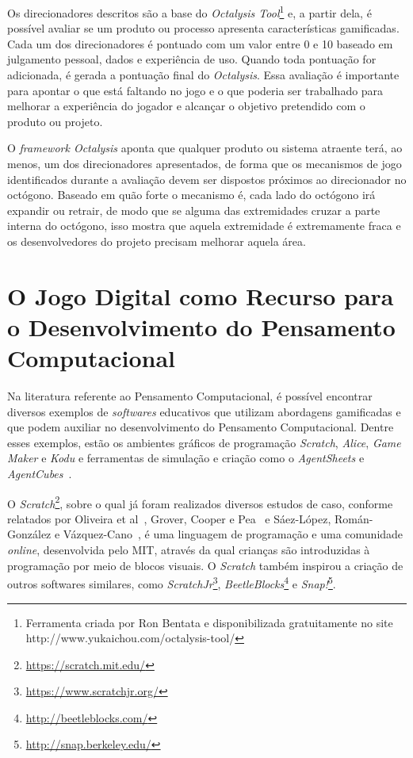 Os direcionadores descritos são a base do \textit{Octalysis Tool}\footnote{Ferramenta criada por Ron Bentata e disponibilizada gratuitamente no site http://www.yukaichou.com/octalysis-tool/} e, a partir dela, é possível avaliar se um produto ou processo apresenta características gamificadas. Cada um dos direcionadores é pontuado com um valor entre 0 e 10 baseado em julgamento pessoal, dados e experiência de uso. Quando toda pontuação for adicionada, é gerada a pontuação final do \textit{Octalysis}. Essa avaliação é importante para apontar o que está faltando no jogo e o que poderia ser trabalhado para melhorar a experiência do jogador e alcançar o objetivo pretendido com o produto ou projeto.

O \textit{framework Octalysis} aponta que qualquer produto ou sistema atraente terá, ao menos, um dos direcionadores apresentados, de forma que os mecanismos de jogo identificados durante a avaliação devem ser dispostos próximos ao direcionador no octógono. Baseado em quão forte o mecanismo é, cada lado do octógono irá expandir ou retrair, de modo que se alguma das extremidades cruzar a parte interna do octógono, isso mostra que aquela extremidade é extremamente fraca e os desenvolvedores do projeto precisam melhorar aquela área.


\section{O Jogo Digital como Recurso para o Desenvolvimento do Pensamento Computacional} \label{sec:jogos_desenvolvimento_pc}

Na literatura referente ao Pensamento Computacional, é possível encontrar diversos exemplos de \textit{softwares} educativos que utilizam abordagens gamificadas e que podem auxiliar no desenvolvimento do Pensamento Computacional. Dentre esses exemplos, estão os ambientes gráficos de programação \textit{Scratch}, \textit{Alice}, \textit{Game Maker} e \textit{Kodu} e ferramentas de simulação e criação como o \textit{AgentSheets} e \textit{AgentCubes}~\cite{grover_computational_2013}. 

O \textit{Scratch}\footnote{\url{https://scratch.mit.edu/}}, sobre o qual já foram realizados diversos estudos de caso, conforme relatados por Oliveira et al~\cite{oliveira_ensino_2014}, Grover, Cooper e Pea~\cite{grover_assessing_2014} e Sáez-López, Román-González e Vázquez-Cano~\cite{saez-lopez_visual_2016}, é uma linguagem de programação e uma comunidade \textit{online}, desenvolvida pelo \acrshort{MIT}, através da qual crianças são introduzidas à programação por meio de blocos visuais. O \textit{Scratch} também inspirou a criação de outros softwares similares, como \textit{ScratchJr}\footnote{\url{https://www.scratchjr.org/}}, \textit{BeetleBlocks}\footnote{\url{http://beetleblocks.com/}} e \textit{Snap!}\footnote{\url{http://snap.berkeley.edu/}}.

